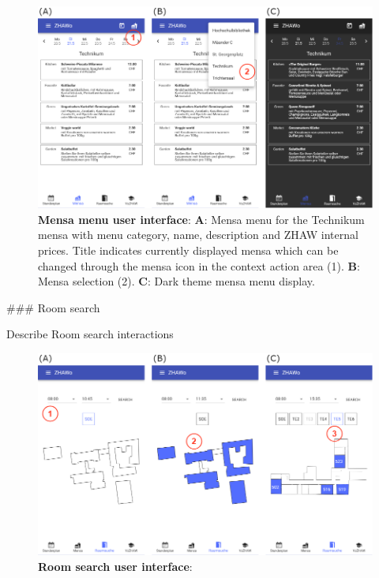 \begin{markdown}
\begin{figure}[H]
  \includegraphics[width=16cm, center]{./figures/menu_figure.png}
  \captionsetup{width=15.5cm}
  \caption[Mensa menu user interface]{\textbf{Mensa menu user interface}: \textbf{A}: Mensa menu for the Technikum mensa with menu category, name, description and ZHAW internal prices. Title indicates currently displayed mensa which can be changed through the mensa icon in the context action area (1). \textbf{B}: Mensa selection (2). \textbf{C}: Dark theme mensa menu display.}
  \label{fig:MenuFigure}
\end{figure}

### Room search

Describe Room search interactions

\begin{figure}[H]
  \includegraphics[width=16cm, center]{./figures/roomsearch_figure1.png}
  \captionsetup{width=15.5cm}
  \caption[Room search user interface]{\textbf{Room search user interface}: }
  \label{fig:RoomSearchFigure}
\end{figure}


\end{markdown}
